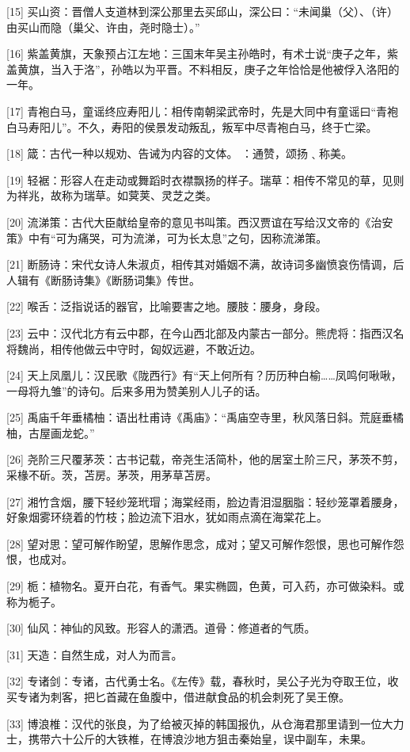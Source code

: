 \documentclass[12pt,UTF8]{ctexbook}
\begin{document}
[15] 买山资：晋僧人支道林到深公那里去买邱山，深公曰：“未闻巢（父）、（许）由买山而隐（巢父、许由，尧时隐士）。”

[16] 紫盖黄旗，天象预占江左地：三国末年吴主孙皓时，有术士说“庚子之年，紫盖黄旗，当入于洛”，孙皓以为平晋。不料相反，庚子之年恰恰是他被俘入洛阳的一年。

[17] 青袍白马，童谣终应寿阳儿：相传南朝梁武帝时，先是大同中有童谣曰“青袍白马寿阳儿”。不久，寿阳的侯景发动叛乱，叛军中尽青袍白马，终于亡梁。

[18] 箴：古代一种以规劝、告诫为内容的文体。 ：通赞，颂扬﹑称美。

[19] 轻裾：形容人在走动或舞蹈时衣襟飘扬的样子。瑞草：相传不常见的草，见则为祥兆，故称为瑞草。如蓂荚、灵芝之类。

[20] 流涕策：古代大臣献给皇帝的意见书叫策。西汉贾谊在写给汉文帝的《治安策》中有“可为痛哭，可为流涕，可为长太息”之句，因称流涕策。

[21] 断肠诗：宋代女诗人朱淑贞，相传其对婚姻不满，故诗词多幽愤哀伤情调，后人辑有《断肠诗集》《断肠词集》传世。

[22] 喉舌：泛指说话的器官，比喻要害之地。腰肢：腰身，身段。

[23] 云中：汉代北方有云中郡，在今山西北部及内蒙古一部分。熊虎将：指西汉名将魏尚，相传他做云中守时，匈奴远避，不敢近边。

[24] 天上凤凰儿：汉民歌《陇西行》有“天上何所有？历历种白榆……凤鸣何啾啾，一母将九雏”的诗句。后来多用为赞美别人儿子的话。

[25] 禹庙千年垂橘柚：语出杜甫诗《禹庙》：“禹庙空寺里，秋风落日斜。荒庭垂橘柚，古屋画龙蛇。”

[26] 尧阶三尺覆茅茨：古书记载，帝尧生活简朴，他的居室土阶三尺，茅茨不剪，采椽不斫。茨，苫房。茅茨，用茅草苫房。

[27] 湘竹含烟，腰下轻纱笼玳瑁；海棠经雨，脸边青泪湿胭脂：轻纱笼罩着腰身，好象烟雾环绕着的竹枝；脸边流下泪水，犹如雨点滴在海棠花上。

[28] 望对思：望可解作盼望，思解作思念，成对；望又可解作怨恨，思也可解作怨恨，也成对。

[29] 栀：植物名。夏开白花，有香气。果实椭圆，色黄，可入药，亦可做染料。或称为栀子。

[30] 仙风：神仙的风致。形容人的潇洒。道骨：修道者的气质。

[31] 天造：自然生成，对人为而言。

[32] 专诸剑：专诸，古代勇士名。《左传》载，春秋时，吴公子光为夺取王位，收买专诸为刺客，把匕首藏在鱼腹中，借进献食品的机会刺死了吴王僚。

[33] 博浪椎：汉代的张良，为了给被灭掉的韩国报仇，从仓海君那里请到一位大力士，携带六十公斤的大铁椎，在博浪沙地方狙击秦始皇，误中副车，未果。
\end{document}

